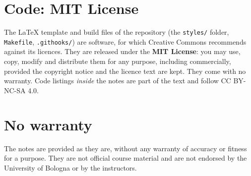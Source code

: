 \section*{Code: MIT License}

The \LaTeX{} template and build files of the repository (the \texttt{styles/} folder, \texttt{Makefile}, \texttt{.githooks/}) are software, for which Creative Commons recommends against its licences. They are released under the \textbf{MIT License}: you may use, copy, modify and distribute them for any purpose, including commercially, provided the copyright notice and the licence text are kept. They come with no warranty. Code listings \emph{inside} the notes are part of the text and follow CC BY-NC-SA 4.0.

\section*{No warranty}

The notes are provided as they are, without any warranty of accuracy or fitness for a purpose. They are not official course material and are not endorsed by the University of Bologna or by the instructors.
